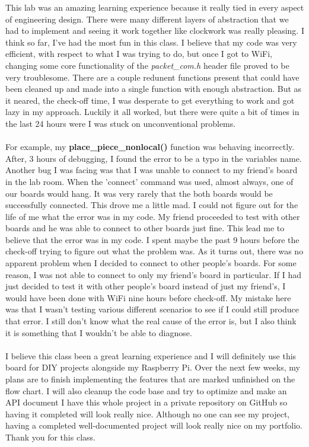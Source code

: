 \documentclass[a4paper, 12pt]{article}
\begin{document}
    This lab was an amazing learning experience because it really tied in every
    aspect of engineering design. There were many different layers of abstraction
    that we had to implement and seeing it work together like clockwork was
    really pleasing. I think so far, I've had the most fun in this class. I
    believe that my code was very efficient, with respect to what I was trying
    to do, but once I got to WiFi, changing some core functionality of the 
    \textit{packet\_com.h} header file proved to be very troublesome. There
    are a couple redunent functions present that could have been cleaned up
    and made into a single function with enough abstraction. But as it neared,
    the check-off time, I was desperate to get everything to work and got lazy
    in my approach. Luckily it all worked, but there were quite a bit of times
    in the last 24 hours were I was stuck on unconventional problems. 
    \\ \\
    For example,
    my \textbf{place\_piece\_nonlocal()} function was behaving incorrectly. After,
    3 hours of debugging, I found the error to be a typo in the variables name.
    Another bug I was facing was that I was unable to connect to my friend's
    board in the lab room. When the 'connect' command was used, almost always,
    one of our boards would hang. It was very rarely that the both boards would
    be successfully connected. This drove me a little mad. I could not figure
    out for the life of me what the error was in my code. My friend proceeded 
    to test with other boards and he was able to connect to other boards just fine.
    This lead me to believe that the error was in my code. I spent maybe the past
    9 hours before the check-off trying to figure out what the problem was. As it
    turns out, there was no apparent problem when I decided to connect to other
    people's boards. For some reason, I was not able to connect to only my friend's
    board in particular. If I had just decided to test it with other people's board
    instead of just my friend's, I would have been done with WiFi nine hours before
    check-off. My mistake here was that I wasn't testing various different scenarios
    to see if I could still produce that error. I still don't know what the real cause
    of the error is, but I also think it is something that I wouldn't be able to
    diagnose.
    \\ \\
    I believe this class been a great learning experience and I will definitely use
    this board for DIY projects alongside my Raspberry Pi. Over the next few weeks,
    my plans are to finish implementing the features that are marked unfinished on
    the flow chart. I will also cleanup the code base and try to optimize and make
    an API document I have this whole project in a private repository on GitHub so having
    it completed will look really nice. Although no one can see my project, having 
    a completed well-documented project will look really nice on my portfolio. 
    Thank you for this class.
\end{document}
